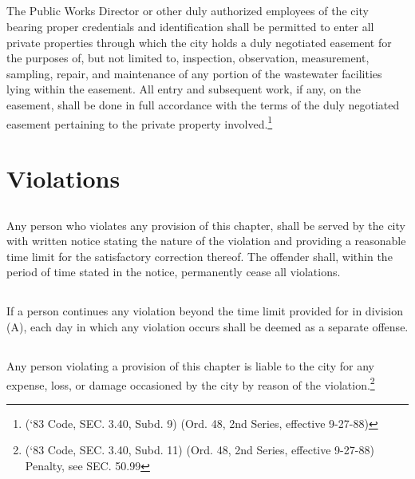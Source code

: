 \subsection{}
The Public Works Director or other duly authorized employees of the city bearing proper credentials and identification shall be permitted to enter all private properties through which the city holds a duly negotiated easement for the purposes of, but not limited to, inspection, observation, measurement, sampling, repair, and maintenance of any portion of the wastewater facilities lying within the easement.  All entry and subsequent work, if any, on the easement, shall be done in full accordance with the terms of the duly negotiated easement pertaining to the private property involved.\footnote{(‘83 Code, SEC. 3.40, Subd. 9) (Ord. 48, 2nd Series, effective 9-27-88)}

\section{Violations}
\subsection{}
Any person who violates any provision of this chapter, shall be served by the city with written notice stating the nature of the violation and providing a reasonable time limit for the satisfactory correction thereof.  The offender shall, within the period of time stated in the notice, permanently cease all violations.
\subsection{}
If a person continues any violation beyond the time limit provided for in division (A), each day in which any violation occurs shall be deemed as a separate offense.
\subsection{}
Any person violating a provision of this chapter is liable to the city for any expense, loss, or damage occasioned by the city by reason of the violation.\footnote{(‘83 Code, SEC. 3.40, Subd. 11) (Ord. 48, 2nd Series, effective 9-27-88) Penalty, see SEC. 50.99}
